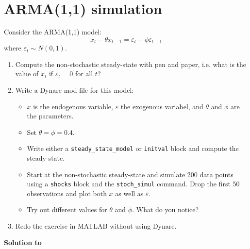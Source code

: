 \section[ARMA(1,1) simulation]{ARMA(1,1) simulation\label{ex:ARMASimulation}}
Consider the ARMA(1,1) model:
$$ x_t - \theta x_{t-1} = \varepsilon_t - \phi \varepsilon_{t-1}$$
where $\varepsilon_t \sim N(0,1)$.

\begin{enumerate}
	\item Compute the non-stochastic steady-state with pen and paper, i.e. what is the value of $x_t$ if $\varepsilon_t = 0$ for all $t$?
	\item Write a Dynare mod file for this model:
	\begin{itemize}
		\item $x$ is the endogenous variable, $\varepsilon$ the exogenous variabel, and $\theta$ and $\phi$ are the parameters.
		\item Set $\theta=\phi=0.4$.
		\item Write either a \texttt{steady\_state\_model} or \texttt{initval} block and compute the steady-state.
		\item Start at the non-stochastic steady-state and simulate 200 data points using a \texttt{shocks} block 
		and the \texttt{stoch\_simul} command. Drop the first 50 observations and plot both $x$ as well as $\varepsilon$.
		\item Try out different values for $\theta$ and $\phi$. What do you notice?
	\end{itemize}
	\item Redo the exercise in MATLAB without using Dynare.	
\end{enumerate}


\begin{solution}\textbf{Solution to }
\ifDisplaySolutions

\fi
\newpage
\end{solution}